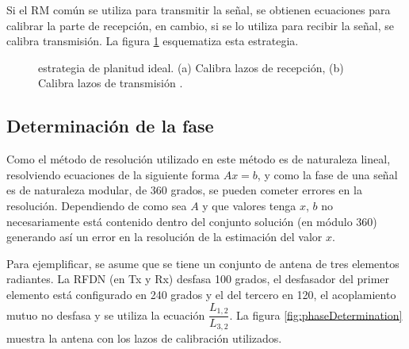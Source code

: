 Si el RM común se utiliza para transmitir la señal, se obtienen ecuaciones para calibrar la parte de recepción, en cambio,
si se lo utiliza para recibir la señal, se calibra transmisión. La figura \ref{fig:ideal_strategy} esquematiza esta estrategia.

\begin{figure}[H]
 \centering
	\caption{estrategia de planitud ideal. (a) Calibra lazos de recepción, (b) Calibra lazos de transmisión \cite{Aumann1989}.}
 \label{fig:ideal_strategy}
\end{figure}


\subsection{Determinación de la fase} \label{ssc:mutualPhase}

Como el método de resolución utilizado en este método es de naturaleza lineal, resolviendo ecuaciones de la siguiente forma
$Ax = b$, y como la fase de una señal es de naturaleza modular, de 360 grados, se pueden cometer errores en la resolución.
Dependiendo de como sea $A$ y que valores tenga $x$, $b$ no necesariamente está contenido dentro del conjunto solución (en
módulo 360) generando así un error en la resolución de la estimación del valor $x$.

Para ejemplificar, se asume que se tiene un conjunto de antena de tres elementos radiantes. La RFDN (en Tx y Rx) desfasa 100
grados, el desfasador del primer elemento está configurado en 240 grados y el del tercero en 120, el acoplamiento mutuo no desfasa
y se utiliza la ecuación $\dfrac{L_{1,2}}{L_{3, 2}}$. La figura \ref{fig:phaseDetermination} muestra la antena con los 
lazos de calibración utilizados.

